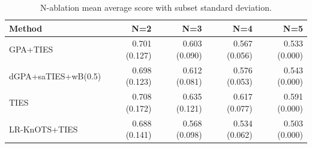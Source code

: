 \begin{table}[htbp]
\centering
\caption{N-ablation mean average score with subset standard deviation.}
\label{tab:n-ablation}
\begin{tabular}{lrrrr}
\toprule
Method & N=2 & N=3 & N=4 & N=5 \\
\midrule
GPA+TIES & 0.701 (0.127) & 0.603 (0.090) & 0.567 (0.056) & 0.533 (0.000) \\
dGPA+saTIES+wB(0.5) & 0.698 (0.123) & 0.612 (0.081) & 0.576 (0.053) & 0.543 (0.000) \\
TIES & 0.708 (0.172) & 0.635 (0.121) & 0.617 (0.077) & 0.591 (0.000) \\
LR-KnOTS+TIES & 0.688 (0.141) & 0.568 (0.098) & 0.534 (0.062) & 0.503 (0.000) \\
\bottomrule
\end{tabular}
\end{table}
